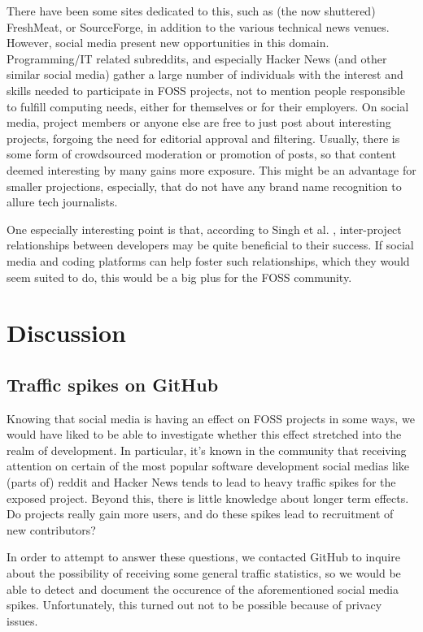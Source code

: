 \documentclass[a4paper,11pt]{article} %
\begin{document}
There have been some sites dedicated to this, such as (the now
shuttered) FreshMeat, or SourceForge, in addition to the various
technical news venues. However, social media present new opportunities
in this domain. Programming/IT related subreddits, and especially
Hacker News (and other similar social media) gather a large number of
individuals with the interest and skills needed to participate in FOSS
projects, not to mention people responsible to fulfill computing
needs, either for themselves or for their employers.  On social media,
project members or anyone else are free to just post about interesting
projects, forgoing the need for editorial approval and
filtering. Usually, there is some form of crowdsourced moderation or
promotion of posts, so that content deemed interesting by many gains
more exposure. This might be an advantage for smaller projections,
especially, that do not have any brand name recognition to allure tech
journalists.

One especially interesting point is that, according to Singh et
al. \cite{singh2011network}, inter-project relationships between
developers may be quite beneficial to their success. If social media
and coding platforms can help foster such relationships, which they
would seem suited to do, this would be a big plus for the FOSS
community.

\section{Discussion}

\subsection{Traffic spikes on GitHub}

Knowing that social media is having an effect on FOSS projects in some
ways, we would have liked to be able to investigate whether this
effect stretched into the realm of development. In particular, it's
known in the community that receiving attention on certain of the most
popular software development social medias like (parts of) reddit and
Hacker News tends to lead to heavy traffic spikes for the exposed
project. Beyond this, there is little knowledge about longer term
effects. Do projects really gain more users, and do these spikes lead
to recruitment of new contributors?

In order to attempt to answer these questions, we contacted GitHub to
inquire about the possibility of receiving some general traffic
statistics, so we would be able to detect and document the occurence
of the aforementioned social media spikes. Unfortunately, this turned
out not to be possible because of privacy issues.
\end{document}
